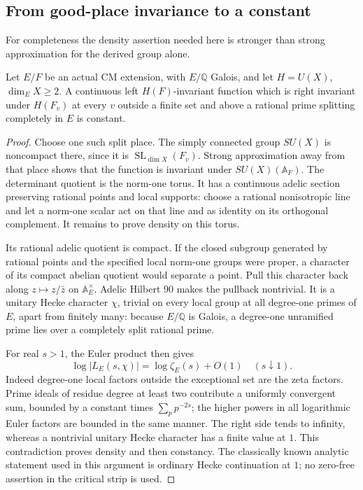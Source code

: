 \subsection{From good-place invariance to a constant}

For completeness the density assertion needed here is stronger
than strong approximation for the derived group alone.

\begin{srlemma}
Let \(E/F\) be an actual CM extension, with \(E/\mathbb Q\)
Galois, and let \(H=U(X)\), \(\dim_E X\geq2\).
A continuous left \(H(F)\)-invariant function which is right
invariant under \(H(F_v)\) at every \(v\) outside a finite set
and above a rational prime splitting completely in \(E\)
is constant.
\end{srlemma}

\begin{proof}
Choose one such split place. The simply connected group
\(SU(X)\) is noncompact there, since it is
\(\operatorname{SL}_{\dim X}(F_v)\).
Strong approximation away from that place shows that the
function is invariant under \(SU(X)(\mathbb A_F)\).
The determinant quotient is the norm-one torus. It has a
continuous adelic section preserving rational points and local
supports: choose a rational nonisotropic line and let a
norm-one scalar act on that line and as identity on its
orthogonal complement. It remains to prove density on this torus.

Its rational adelic quotient is compact. If the closed subgroup
generated by rational points and the specified local norm-one
groups were proper, a character of its compact abelian quotient
would separate a point. Pull this character back along
\(z\mapsto z/\bar z\) on \(\mathbb A_E^\times\).
Adelic Hilbert 90 makes the pullback nontrivial. It is a
unitary Hecke character \(\chi\), trivial on every local group
at all degree-one primes of \(E\), apart from finitely many:
because \(E/\mathbb Q\) is Galois, a degree-one unramified
prime lies over a completely split rational prime.

For real \(s>1\), the Euler product then gives
\[
              \log|L_E(s,\chi)|=\log\zeta_E(s)+O(1)
                                      \quad(s\downarrow1).
\]
Indeed degree-one local factors outside the exceptional set
are the zeta factors. Prime ideals of residue degree at least
two contribute a uniformly convergent sum, bounded by a
constant times \(\sum_p p^{-2s}\); the higher powers in all
logarithmic Euler factors are bounded in the same manner.
The right side tends to infinity, whereas a nontrivial unitary
Hecke character has a finite value at \(1\).
This contradiction proves density and then constancy.
The classically known analytic statement used in this argument
is ordinary Hecke continuation at \(1\); no zero-free assertion
in the critical strip is used.
\end{proof}

